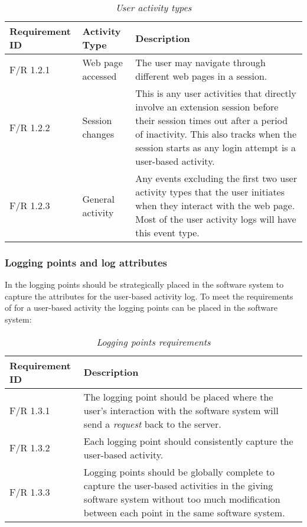 \clearpage

\begin{table}[!htb]
	\centering
	\small
	\caption[User activity types]
	{\textit{User activity types}}
	\label{tbl:Ch2_User_ActivityTypes}
	\begin{tabularx}{\textwidth}{|l|l|X|}
		\hline \textbf{Requirement ID} & \textbf{Activity Type} & \textbf{Description} \\
		\hline F/R 1.2.1 & Web page accessed & The user may navigate through different web pages in a session.\\
		\hline F/R 1.2.2 & Session changes & This is any user activities that directly involve an extension session before their session times out after a period of inactivity. This also tracks when the session starts as any login attempt is a user-based activity.\\
		\hline F/R 1.2.3 & General activity & Any events excluding the first two user activity types that the user initiates when they interact with the web page. Most of the user activity logs will have this event type.\\ 
		\hline
	\end{tabularx}
\end{table}

\subsubsection{Logging points and log attributes}
In  the logging points should be strategically placed in the software system to capture the attributes for the user-based activity log. To meet the requirements of  for a user-based activity the logging points can be placed in the software system:

\begin{table}[!htb]
	\centering
	\small
	\caption[Logging points requirements]
	{\textit{Logging points requirements}}
	\label{tbl:ch2_loggingPointRequirement}
	\begin{tabularx}{\textwidth}{|l|X|}
		\hline \textbf{Requirement ID} & \textbf{Description} \\
		\hline F/R 1.3.1 & The logging point should be placed where the user's interaction with the software system will send a \textit{request} back to the server.\\
		\hline F/R 1.3.2 & Each logging point should consistently capture the user-based activity. \\
		\hline F/R 1.3.3 & Logging points should be globally complete to capture the user-based activities in the giving software system without too much modification between each point in the same software system. \\
		\hline
	\end{tabularx}
\end{table}

